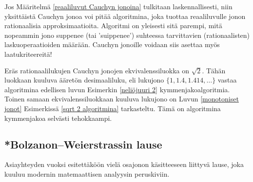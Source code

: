 Jos Määritelmä \ref{reaaliluvut Cauchyn jonoina} tulkitaan laskennallisesti, niin yksittäistä
Cauchyn jonoa voi pitää algoritmina, joka tuottaa reaaliluvulle jonon rationaalisia 
approksimaatioita. Algoritmi on yleisesti sitä parempi, mitä nopeammin jono suppenee 
(tai 'suippenee') suhteessa tarvittavien (rationaalisten) laskuoperaatioiden määrään. Cauchyn
jonoille voidaan siis asettaa myös laatukriteereitä!
\begin{Exa} Eräs rationaalilukujen Cauchyn jonojen ekvivalenssiluokka on $\sqrt{2}$. Tähän
luokkaan kuuluva ääretön desimaaliluku, eli lukujono $\{1,1.4,1.414,\ldots\}$ vastaa
algoritmina edellisen luvun Esimerkin \ref{neliöjuuri 2} kymmenjakoalgoritmia. Toinen samaan
ekvivalenssiluokkaan kuuluva lukujono on Luvun \ref{monotoniset jonot} Esimerkissä
\ref{sqrt 2 algoritmina} tarkasteltu. Tämä on algoritmina kymmenjakoa selvästi tehokkaampi.
\loppu \end{Exa}

\subsection*{*Bolzanon--Weierstrassin lause}

Asiayhteyden vuoksi esitettäköön vielä osajonon käsitteeseen liittyvä lause, joka kuuluu
modernin matemaattisen analyysin peruskiviin.


